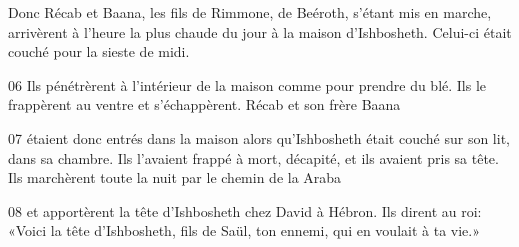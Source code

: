 Donc Récab et Baana, les fils de Rimmone, de Beéroth, s’étant mis en marche, arrivèrent à l’heure la plus chaude du jour à la maison d’Ishbosheth. Celui-ci était couché pour la sieste de midi.

06 Ils pénétrèrent à l’intérieur de la maison comme pour prendre du blé. Ils le frappèrent au ventre et s’échappèrent. Récab et son frère Baana

07 étaient donc entrés dans la maison alors qu’Ishbosheth était couché sur son lit, dans sa chambre. Ils l’avaient frappé à mort, décapité, et ils avaient pris sa tête. Ils marchèrent toute la nuit par le chemin de la Araba

08 et apportèrent la tête d’Ishbosheth chez David à Hébron. Ils dirent au roi: «Voici la tête d’Ishbosheth, fils de Saül, ton ennemi, qui en voulait à ta vie.»
